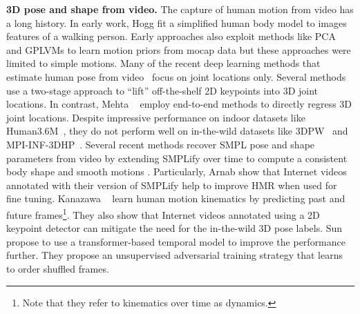 \documentclass[10pt,twocolumn,letterpaper]{article}
\begin{document}
{\bf 3D pose and shape from video.} 
The capture of human motion from video has a long history.
In early work, Hogg \etal \cite{hogg_walking} fit a simplified human body model to images features of a walking person.
Early approaches also exploit methods like PCA and GPLVMs to learn motion priors from mocap data \cite{ormoneit_cyclic_2001,Urtasun2006} but these approaches were limited to simple motions.
Many of the recent deep learning methods that estimate human pose from video~\cite{dabral2017_tpnet,hossain2018exploiting,Mehta2018XNectRM,pavllo:videopose3d:2019,VNect_SIGGRAPH2017} focus on joint locations only. 
Several methods
\cite{dabral2017_tpnet,hossain2018exploiting,pavllo:videopose3d:2019} use a two-stage approach to ``lift'' off-the-shelf 2D keypoints into 3D joint locations. 
In contrast, Mehta \etal~\cite{Mehta2018XNectRM,VNect_SIGGRAPH2017} employ end-to-end methods to directly regress 3D joint locations. 
Despite impressive performance on indoor datasets like Human3.6M~\cite{ionescu_h36m}, they do not perform well on in-the-wild datasets like 3DPW~\cite{vonMarcard2018_3dpw} and MPI-INF-3DHP~\cite{mpiiinf3dhp_mono-2017}. Several recent methods recover SMPL pose and shape parameters from video by extending SMPLify over time to compute a consistent body shape and smooth motions \cite{arnab_kineticspose,huang_mvsmplify}.
Particularly, Arnab \etal \cite{arnab_kineticspose} show that Internet videos annotated with their version of SMPLify help to improve HMR when used for fine tuning. 
Kanazawa \etal~\cite{kanazawa_temporal_hmr} learn human motion kinematics 
by predicting past and future frames\footnote{Note that they refer to kinematics over time as dynamics.}. 
They also show that Internet videos annotated using a 2D keypoint detector can mitigate the need for the in-the-wild 3D pose labels.
Sun \etal~\cite{Sun_2019_ICCV} propose to use a transformer-based temporal model \cite{vaswani_transformers}  to improve the performance further. They propose an unsupervised adversarial training strategy that learns to order shuffled frames.   
\end{document}
